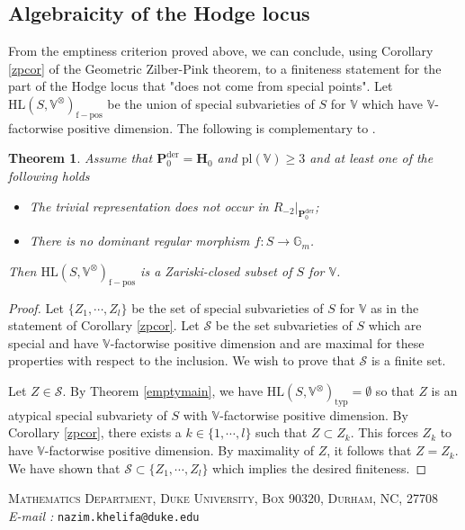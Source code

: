 \documentclass[10pt]{article}
\numberwithin{equation}{subsection}
\theoremstyle{plain}
\newtheorem{theorem}{Theorem}[section]
\theoremstyle{definition}
\theoremstyle{remark}
\newcommand{\V}{\mathbb V}
\newcommand{\mult}{\mathbb G}
\newcommand{\pp}{\mathbf P}
\newcommand{\mon}{\mathbf H}
\newcommand{\HL}{\mathrm{HL}(S, \V^\otimes)}
\newcommand{\typ}{\mathrm{typ}}
\newcommand{\der}{\mathrm{der}}
\begin{document}
\subsection{Algebraicity of the Hodge locus}
From the emptiness criterion proved above, we can conclude, using Corollary \ref{zpcor} of the Geometric Zilber-Pink theorem, to a finiteness statement for the part of the Hodge locus that "does not come from special points". Let $\HL_{\mathrm{f-pos}}$ be the union of special subvarieties of $S$ for $\V$ which have $\V$-factorwise positive dimension. The following is complementary to \cite[Thm. 3.2]{ketay}.
\begin{theorem}\label{alglvl3}
Assume that $\pp_0^\der = \mon_0$ and $\mathrm{pl}(\V) \geqslant 3$ and at least one of the following holds
\begin{itemize}
\item[(A)] The trivial representation does not occur in $R_{-2}\vert_{\pp_0^\der}$;
\item[(B)] There is no dominant regular morphism $f : S \rightarrow \mult_m$.
\end{itemize} 
Then $\HL_{\mathrm{f-pos}}$ is a Zariski-closed subset of $S$ for $\V$.
\end{theorem}
\begin{proof}
Let $\{Z_1, \cdots, Z_l\}$ be the set of special subvarieties of $S$ for $\V$ as in the statement of Corollary \ref{zpcor}. Let $\mathscr{S}$ be the set subvarieties of $S$ which are special and have $\V$-factorwise positive dimension and are maximal for these properties with respect to the inclusion. We wish to prove that $\mathscr{S}$ is a finite set. 

Let $Z \in \mathscr{S}$. By Theorem \ref{emptymain}, we have $\HL_\typ = \emptyset$ so that $Z$ is an atypical special subvariety of $S$ with $\V$-factorwise positive dimension. By Corollary \ref{zpcor}, there exists a $k \in \{1, \cdots, l\}$ such that $Z \subset Z_k$. This forces $Z_k$ to have $\V$-factorwise positive dimension. By maximality of $Z$, it follows that $Z = Z_k$. We have shown that $\mathscr{S} \subset \{Z_1, \cdots, Z_l\}$ which implies the desired finiteness.
\end{proof}
\printbibliography
\bigskip
\noindent
\small{\textsc{Mathematics Department, Duke University, Box 90320, Durham, NC, 27708}\\
\textit{E-mail :} \texttt{nazim.khelifa@duke.edu}}
\end{document}
